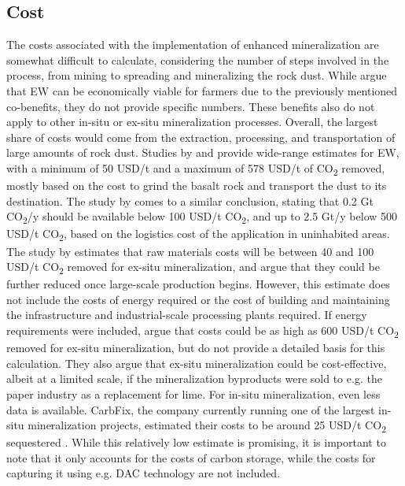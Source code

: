 \subsection*{Cost}
The costs associated with the implementation of enhanced mineralization are somewhat difficult to calculate, considering the number of steps involved in the process, from mining to spreading and mineralizing the rock dust. While \textcite{Almaraz2022MethodsSettings} argue that EW can be economically viable for farmers due to the previously mentioned co-benefits, they do not provide specific numbers. These benefits also do not apply to other in-situ or ex-situ mineralization processes. Overall, the largest share of costs would come from the extraction, processing, and transportation of large amounts of rock dust. Studies by \textcite{Beerling2018FarmingSecurity} and \textcite{Fuss2018NegativeEffects} provide wide-range estimates for EW, with a minimum of 50 USD/t and a maximum of 578 USD/t of CO\textsubscript{2} removed, mostly based on the cost to grind the basalt rock and transport the dust to its destination. The study by \textcite{Goll2021PotentialRock} comes to a similar conclusion, stating that 0.2 Gt CO\textsubscript{2}/y should be available below 100 USD/t CO\textsubscript{2}, and up to 2.5 Gt/y below 500 USD/t CO\textsubscript{2}, based on the logistics cost of the application in uninhabited areas.
The study by \textcite{Lackner1997ProgressSubstrates} estimates that raw materials costs will be between 40 and 100 USD/t CO\textsubscript{2} removed for ex-situ mineralization, and argue that they could be further reduced once large-scale production begins. However, this estimate does not include the costs of energy required or the cost of building and maintaining the infrastructure and industrial-scale processing plants required. If energy requirements were included, \textcite{Lawler2021CarbonMineralization} argue that costs could be as high as 600 USD/t CO\textsubscript{2} removed for ex-situ mineralization, but do not provide a detailed basis for this calculation. They also argue that ex-situ mineralization could be cost-effective, albeit at a limited scale, if the mineralization byproducts were sold to e.g. the paper industry as a replacement for lime. For in-situ mineralization, even less data is available. CarbFix, the company currently running one of the largest in-situ mineralization projects, estimated their costs to be around 25 USD/t CO\textsubscript{2} sequestered \parencite{Lawler2021CarbonMineralization}. While this relatively low estimate is promising, it is important to note that it only accounts for the costs of carbon storage, while the costs for capturing it using e.g. DAC technology are not included.
